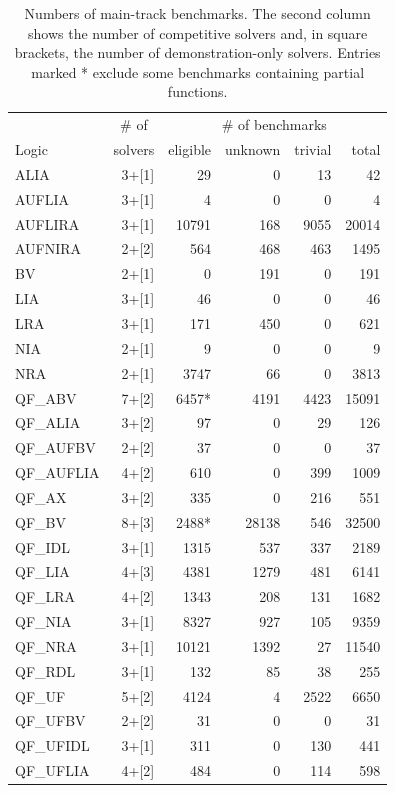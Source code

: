\documentclass[twoside,11pt]{article}
\begin{document}
\begin{table}
\caption{Numbers of main-track benchmarks. The second column shows the number of competitive solvers and, in square brackets, the number of demonstration-only solvers. Entries marked * exclude some benchmarks containing partial functions.}
\label{Table:benchmarks}
\centering
\begin{tabular}{|l|r|r|r|r|r|}
\hline
       & \multicolumn{1}{|c|}{\# of} & \multicolumn{4}{|c|}{\# of benchmarks} \\
 Logic & solvers & eligible & unknown  & trivial & total  \\
\hline
ALIA & 3+[1] & 29 & 0 & 13 & 42 \\
AUFLIA & 3+[1] & 4 & 0 & 0 & 4\\
AUFLIRA & 3+[1] & 10791 & 168 & 9055 & 20014 \\
AUFNIRA & 2+[2] & 564 & 468 & 463 & 1495 \\
BV & 2+[1] & 0 & 191 & 0 & 191 \\
LIA & 3+[1] & 46 & 0 & 0 & 46 \\
LRA & 3+[1] & 171 & 450 & 0 & 621\\
NIA & 2+[1] & 9 & 0 & 0 & 9\\
NRA & 2+[1] & 3747 & 66 & 0 & 3813 \\
QF\_ABV & 7+[2] & 6457* & 4191 & 4423 & 15091 \\
QF\_ALIA & 3+[2] & 97 & 0 & 29 & 126 \\
QF\_AUFBV & 2+[2] & 37 & 0 & 0 & 37 \\
QF\_AUFLIA & 4+[2] & 610 & 0 & 399 & 1009\\
QF\_AX & 3+[2] & 335 & 0 & 216 & 551 \\
QF\_BV & 8+[3] & 2488* & 28138 & 546 & 32500 \\
QF\_IDL & 3+[1] & 1315 & 537 & 337 & 2189 \\
QF\_LIA & 4+[3] & 4381 & 1279 & 481 & 6141 \\
QF\_LRA & 4+[2] & 1343 & 208 & 131 & 1682\\
QF\_NIA & 3+[1] & 8327 & 927 & 105 & 9359 \\
QF\_NRA & 3+[1] & 10121 & 1392 & 27 & 11540 \\
QF\_RDL & 3+[1] & 132 & 85 & 38 & 255 \\
QF\_UF & 5+[2] & 4124 & 4 & 2522 & 6650 \\
QF\_UFBV & 2+[2] & 31 & 0 & 0 & 31 \\
QF\_UFIDL & 3+[1] & 311 & 0 & 130 & 441\\
QF\_UFLIA & 4+[2] & 484 & 0 & 114 & 598 \\

\end{tabular}
\end{table}
\end{document}
